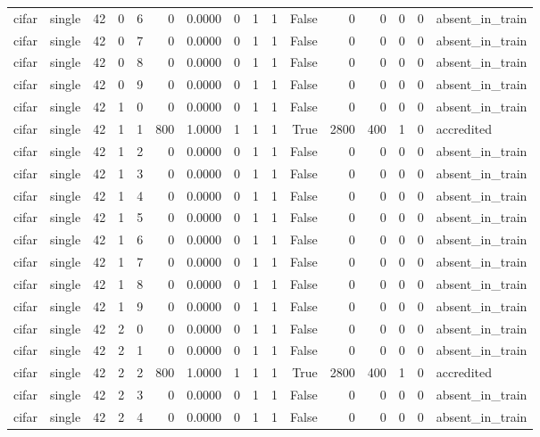 \begin{tabular}{llrrrrrrrrrrrrrl}
cifar & single & 42 & 0 & 6 & 0 & 0.0000 & 0 & 1 & 1 & False & 0 & 0 & 0 & 0 & absent\_in\_train \\
cifar & single & 42 & 0 & 7 & 0 & 0.0000 & 0 & 1 & 1 & False & 0 & 0 & 0 & 0 & absent\_in\_train \\
cifar & single & 42 & 0 & 8 & 0 & 0.0000 & 0 & 1 & 1 & False & 0 & 0 & 0 & 0 & absent\_in\_train \\
cifar & single & 42 & 0 & 9 & 0 & 0.0000 & 0 & 1 & 1 & False & 0 & 0 & 0 & 0 & absent\_in\_train \\
cifar & single & 42 & 1 & 0 & 0 & 0.0000 & 0 & 1 & 1 & False & 0 & 0 & 0 & 0 & absent\_in\_train \\
cifar & single & 42 & 1 & 1 & 800 & 1.0000 & 1 & 1 & 1 & True & 2800 & 400 & 1 & 0 & accredited \\
cifar & single & 42 & 1 & 2 & 0 & 0.0000 & 0 & 1 & 1 & False & 0 & 0 & 0 & 0 & absent\_in\_train \\
cifar & single & 42 & 1 & 3 & 0 & 0.0000 & 0 & 1 & 1 & False & 0 & 0 & 0 & 0 & absent\_in\_train \\
cifar & single & 42 & 1 & 4 & 0 & 0.0000 & 0 & 1 & 1 & False & 0 & 0 & 0 & 0 & absent\_in\_train \\
cifar & single & 42 & 1 & 5 & 0 & 0.0000 & 0 & 1 & 1 & False & 0 & 0 & 0 & 0 & absent\_in\_train \\
cifar & single & 42 & 1 & 6 & 0 & 0.0000 & 0 & 1 & 1 & False & 0 & 0 & 0 & 0 & absent\_in\_train \\
cifar & single & 42 & 1 & 7 & 0 & 0.0000 & 0 & 1 & 1 & False & 0 & 0 & 0 & 0 & absent\_in\_train \\
cifar & single & 42 & 1 & 8 & 0 & 0.0000 & 0 & 1 & 1 & False & 0 & 0 & 0 & 0 & absent\_in\_train \\
cifar & single & 42 & 1 & 9 & 0 & 0.0000 & 0 & 1 & 1 & False & 0 & 0 & 0 & 0 & absent\_in\_train \\
cifar & single & 42 & 2 & 0 & 0 & 0.0000 & 0 & 1 & 1 & False & 0 & 0 & 0 & 0 & absent\_in\_train \\
cifar & single & 42 & 2 & 1 & 0 & 0.0000 & 0 & 1 & 1 & False & 0 & 0 & 0 & 0 & absent\_in\_train \\
cifar & single & 42 & 2 & 2 & 800 & 1.0000 & 1 & 1 & 1 & True & 2800 & 400 & 1 & 0 & accredited \\
cifar & single & 42 & 2 & 3 & 0 & 0.0000 & 0 & 1 & 1 & False & 0 & 0 & 0 & 0 & absent\_in\_train \\
cifar & single & 42 & 2 & 4 & 0 & 0.0000 & 0 & 1 & 1 & False & 0 & 0 & 0 & 0 & absent\_in\_train \\

\end{tabular}
